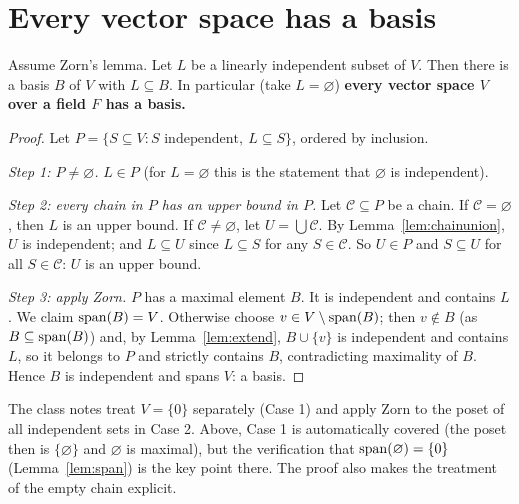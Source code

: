 \section{Every vector space has a basis}

\begin{theorem}\label{thm:basis}
	Assume Zorn's lemma. Let $L$ be a linearly independent subset of $V$. Then there is a basis $B$ of $V$ with $L\subseteq B$. In particular (take $L=\varnothing$) \textbf{every vector space $V$ over a field $F$ has a basis.}
\end{theorem}
\begin{proof}
	Let $P=\{S\subseteq V:S\text{ independent},\ L\subseteq S\}$, ordered by inclusion.
	
	\emph{Step 1: $P\ne\varnothing$.} $L\in P$ (for $L=\varnothing$ this is the statement that $\varnothing$ is independent).
	
	\emph{Step 2: every chain in $P$ has an upper bound in $P$.} Let $\mathcal C\subseteq P$ be a chain. If $\mathcal C=\varnothing$, then $L$ is an upper bound. If $\mathcal C\ne\varnothing$, let $U=\bigcup\mathcal C$. By Lemma~\ref{lem:chainunion}, $U$ is independent; and $L\subseteq U$ since $L\subseteq S$ for any $S\in\mathcal C$. So $U\in P$ and $S\subseteq U$ for all $S\in\mathcal C$: $U$ is an upper bound.
	
	\emph{Step 3: apply Zorn.} $P$ has a maximal element $B$. It is independent and contains $L$. We claim $\operatorname{span}(B)=V$. Otherwise choose $v\in V\setminus\operatorname{span}(B)$; then $v\notin B$ (as $B\subseteq\operatorname{span}(B)$) and, by Lemma~\ref{lem:extend}, $B\cup\{v\}$ is independent and contains $L$, so it belongs to $P$ and strictly contains $B$, contradicting maximality of $B$. Hence $B$ is independent and spans $V$: a basis.
\end{proof}

\begin{remark}
	The class notes treat $V=\{0\}$ separately (Case 1) and apply Zorn to the poset of all independent sets in Case 2. Above, Case 1 is automatically covered (the poset then is $\{\varnothing\}$ and $\varnothing$ is maximal), but the verification that $\operatorname{span}(\varnothing)=\{0\}$ (Lemma~\ref{lem:span}) is the key point there. The proof also makes the treatment of the empty chain explicit.
\end{remark}


